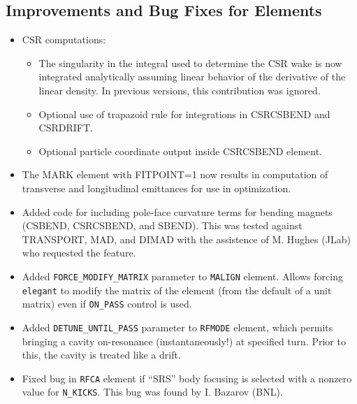 \documentclass[11pt]{article}
\begin{document}
\subsection{Improvements and Bug Fixes for Elements}
\begin{itemize}
\item CSR computations:
	\begin{itemize}
	\item The singularity in the integral used to determine the 
		CSR wake is now integrated analytically assuming linear
		behavior of the derivative of the linear density.
		In previous versions, this contribution was ignored.
	\item Optional use of trapazoid rule for integrations in CSRCSBEND 
		and CSRDRIFT.
	\item Optional particle coordinate output inside CSRCSBEND element.
	\end{itemize}
\item The MARK element with FITPOINT=1 now results in computation of transverse and
	longitudinal emittances for use in optimization.
\item Added code for including pole-face curvature terms for bending magnets
 	(CSBEND, CSRCSBEND, and SBEND).  This was tested against 
	TRANSPORT, MAD, and DIMAD with the assistence of M. Hughes (JLab)
	who requested the feature.
\item Added \verb|FORCE_MODIFY_MATRIX| parameter to \verb|MALIGN| element.
	Allows forcing \verb|elegant| to modify the matrix of the element
	(from the default of a unit matrix) even if \verb|ON_PASS| control
	is used.
\item Added \verb|DETUNE_UNTIL_PASS| parameter to \verb|RFMODE| element,
	which permits bringing a cavity on-resonance (instantaneously!) at
	specified turn.  Prior to this, the cavity is treated like a drift.
\item Fixed bug in \verb|RFCA| element if ``SRS'' body focusing is selected
	with a nonzero value for \verb|N_KICKS|.  This bug was found by 
	I. Bazarov (BNL).
\end{itemize}
\end{document}
